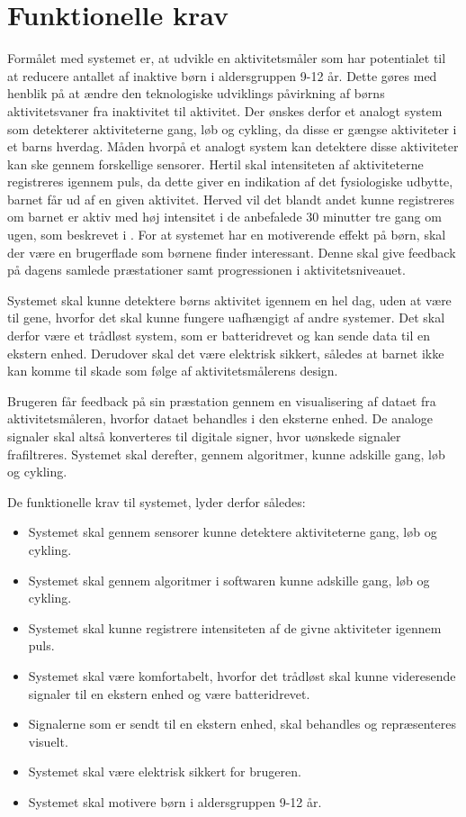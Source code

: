 \section{Funktionelle krav}
Formålet med systemet er, at udvikle en aktivitetsmåler som har potentialet til at reducere antallet af inaktive børn i aldersgruppen 9-12 år. Dette gøres med henblik på at ændre den teknologiske udviklings påvirkning af børns aktivitetsvaner fra inaktivitet til aktivitet.
Der ønskes derfor et analogt system som detekterer aktiviteterne gang, løb og cykling, da disse er gængse aktiviteter i et barns hverdag. Måden hvorpå et analogt system kan detektere disse aktiviteter kan ske gennem forskellige sensorer.
Hertil skal intensiteten af aktiviteterne registreres igennem puls, da dette giver en indikation af det fysiologiske udbytte, barnet får ud af en given aktivitet. Herved vil det blandt andet kunne registreres om barnet er aktiv med høj intensitet i de anbefalede 30 minutter tre gang om ugen, som beskrevet i . \newline
For at systemet har en motiverende effekt på børn, skal der være en brugerflade som børnene finder interessant. Denne skal give feedback på dagens samlede præstationer samt progressionen i aktivitetsniveauet.

Systemet skal kunne detektere børns aktivitet igennem en hel dag, uden at være til gene, hvorfor det skal kunne fungere uafhængigt af andre systemer. Det skal derfor være et trådløst system, som er batteridrevet og kan sende data til en ekstern enhed. Derudover skal det være elektrisk sikkert, således at barnet ikke kan komme til skade som følge af aktivitetsmålerens design. 

Brugeren får feedback på sin præstation gennem en visualisering af dataet fra aktivitetsmåleren, hvorfor dataet behandles i den eksterne enhed.
De analoge signaler skal altså konverteres til digitale signer, hvor uønskede signaler frafiltreres. Systemet skal derefter, gennem algoritmer, kunne adskille gang, løb og cykling.

De funktionelle krav til systemet, lyder derfor således: 
\begin{itemize}
	\item Systemet skal gennem sensorer kunne detektere aktiviteterne gang, løb og cykling.
	\item Systemet skal gennem algoritmer i softwaren kunne adskille gang, løb og cykling.
	\item Systemet skal kunne registrere intensiteten af de givne aktiviteter igennem puls.
	\item Systemet skal være komfortabelt, hvorfor det trådløst skal kunne videresende signaler til en ekstern enhed og være batteridrevet.
	\item Signalerne som er sendt til en ekstern enhed, skal behandles og repræsenteres visuelt.
	\item Systemet skal være elektrisk sikkert for brugeren.
	\item Systemet skal motivere børn i aldersgruppen 9-12 år. 
\end{itemize}
